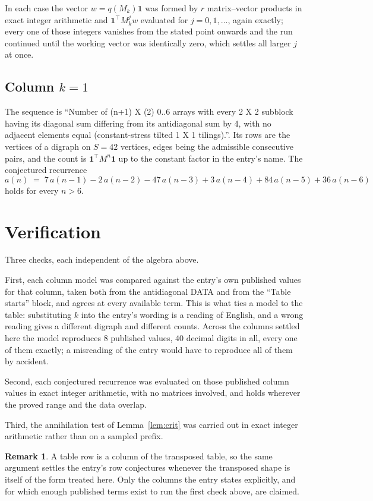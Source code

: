 \documentclass[11pt,a4paper]{article}
\theoremstyle{plain}
\theoremstyle{definition}
\newtheorem{remark}[theorem]{Remark}
\begin{document}
In each case the vector $w=q(M_k)\mathbf{1}$ was formed by $r$ matrix--vector products in
exact integer arithmetic and $\mathbf{1}^{\!\top}M_k^{j}w$ evaluated for $j=0,1,\dots$,
again exactly; every one of those integers vanishes from the stated point onwards and the run
continued until the working vector was identically zero, which settles all larger $j$ at once.

\subsection*{Column $k=1$}
The sequence is ``Number of (n+1) X (2) 0..6 arrays with every 2 X 2 subblock having its diagonal sum differing from its antidiagonal sum by 4, with no adjacent elements equal (constant-stress tilted 1 X 1 tilings).''. Its rows are the vertices of a digraph on
$S=42$ vertices, edges being the admissible consecutive pairs, and the count is
$\mathbf{1}^{\!\top}M^{n}\mathbf{1}$ up to the constant factor in the entry's name.
The conjectured recurrence
\[
a(n)\;=\;7\,a(n-1) - 2\,a(n-2) - 47\,a(n-3) + 3\,a(n-4) + 84\,a(n-5) + 36\,a(n-6)
\]
holds for every $n>6$.

\section{Verification}

Three checks, each independent of the algebra above.

First, each column model was compared against the entry's own published values for that
column, taken both from the antidiagonal DATA and from the ``Table starts'' block, and agrees
at every available term. This is what ties a model to the table: substituting $k$ into the
entry's wording is a reading of English, and a wrong reading gives a different digraph and
different counts. Across the columns settled here the model reproduces $8$ published
values, $40$ decimal digits in all, every one of them exactly; a misreading of the entry
would have to reproduce all of them by accident.

Second, each conjectured recurrence was evaluated on those published column values in exact
integer arithmetic, with no matrices involved, and holds wherever the proved range and the
data overlap.

Third, the annihilation test of Lemma~\ref{lem:crit} was carried out in exact integer
arithmetic rather than on a sampled prefix.

\begin{remark}
A table row is a column of the transposed table, so the same argument settles the entry's row
conjectures whenever the transposed shape is itself of the form treated here. Only the columns
the entry states explicitly, and for which enough published terms exist to run the first check
above, are claimed.
\end{remark}
\end{document}
